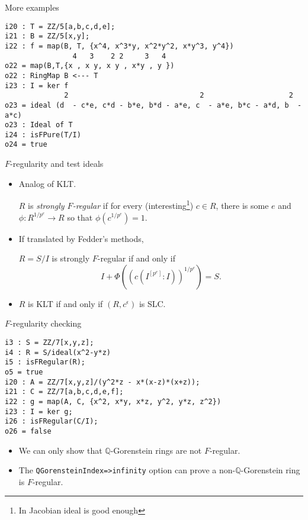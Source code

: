 \documentclass[xcolor=dvipsnames]{beamer}
\newcommand{\memph}[1]{{\color{Red}\emph{#1}}}
\newcommand{\bQ}{\mathbb{Q}}
\theoremstyle{remark}
\begin{document}
\begin{frame}[fragile]{More examples}
  \begin{verbatim}
i20 : T = ZZ/5[a,b,c,d,e];
i21 : B = ZZ/5[x,y];
i22 : f = map(B, T, {x^4, x^3*y, x^2*y^2, x*y^3, y^4})
                4   3    2 2     3   4
o22 = map(B,T,{x , x y, x y , x*y , y })
o22 : RingMap B <--- T
i23 : I = ker f
              2                               2                    2
o23 = ideal (d  - c*e, c*d - b*e, b*d - a*e, c  - a*e, b*c - a*d, b  - a*c)
o23 : Ideal of T
i24 : isFPure(T/I)
o24 = true
  \end{verbatim}
\end{frame}

\begin{frame}[t]{$F$-regularity and test ideals}
  \begin{itemize}
    \item<1->  Analog of KLT.
    \begin{definition}
      $R$ is \memph{strongly $F$-regular} if for every (interesting\footnote{In Jacobian ideal is good enough}) $c \in R$, there is some $e$ and $\phi : R^{1/p^e} \to R$ so that $\phi(c^{1/p^e}) = 1$.
    \end{definition}
    \item<2->  If translated by Fedder's methods,
    \begin{theorem}
      $R = S/I$ is strongly $F$-regular if and only if
      \[
      I + \Phi( (c(I^{[p^e]} : I))^{1/p^e} ) = S.
      \]
    \end{theorem}
    \item<3->  $R$ is KLT if and only if $(R, c^{\epsilon})$ is SLC.
  \end{itemize}
\end{frame}

\begin{frame}[fragile]{$F$-regularity checking}
  \begin{verbatim}
i3 : S = ZZ/7[x,y,z];
i4 : R = S/ideal(x^2-y*z)
i5 : isFRegular(R);
o5 = true
i20 : A = ZZ/7[x,y,z]/(y^2*z - x*(x-z)*(x+z));
i21 : C = ZZ/7[a,b,c,d,e,f];
i22 : g = map(A, C, {x^2, x*y, x*z, y^2, y*z, z^2})
i23 : I = ker g;
i26 : isFRegular(C/I);
o26 = false
  \end{verbatim}
\begin{itemize}
    \item<2->  We can only show that $\bQ$-Gorenstein rings are not $F$-regular.
    \item<3->  The {\tt QGorensteinIndex=>infinity} option can prove a non-$\bQ$-Gorenstein ring is $F$-regular.
\end{itemize}
\end{frame}
\end{document}
